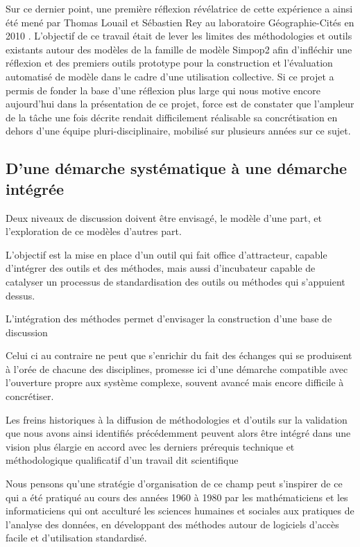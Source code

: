 Sur ce dernier point, une première réflexion révélatrice de cette expérience a ainsi été mené par Thomas Louail et Sébastien Rey au laboratoire Géographie-Cités en 2010 \autocite{Louail2010}. L'objectif de ce travail était de lever les limites des méthodologies et outils existants autour des modèles de la famille de modèle Simpop2 afin d'infléchir une réflexion et des premiers outils prototype pour la construction et l'évaluation automatisé de modèle dans le cadre d'une utilisation collective. Si ce projet a permis de fonder la base d'une réflexion plus large qui nous motive encore aujourd'hui dans la présentation de ce projet, force est de constater que l'ampleur de la tâche une fois décrite rendait difficilement réalisable sa concrétisation en dehors d'une équipe pluri-disciplinaire, mobilisé sur plusieurs années sur ce sujet.


\subsection{D'une démarche systématique à une démarche intégrée}


Deux niveaux de discussion doivent être envisagé, le modèle d'une part, et l'exploration de ce modèles d'autres part.


L'objectif est la mise en place d'un outil qui fait office d'attracteur,  capable d'intégrer des outils et des méthodes, mais aussi d'incubateur capable de catalyser un processus de standardisation des outils ou méthodes qui s'appuient dessus. 

L'intégration des méthodes permet d'envisager la construction d'une base de discussion

Celui ci au contraire ne peut que s'enrichir du fait des échanges qui se produisent à l'orée de chacune des disciplines, promesse ici d'une démarche compatible avec l'ouverture propre aux système complexe, souvent avancé mais encore difficile à concrétiser.
 
Les freins historiques à la diffusion de méthodologies et d'outils sur la validation que nous avons ainsi identifiés précédemment peuvent alors être intégré dans une vision plus élargie en accord avec les derniers prérequis technique et méthodologique qualificatif d'un travail dit scientifique

Nous pensons qu’une stratégie d’organisation de ce champ peut s’inspirer  de ce qui a été pratiqué au cours des années 1960 à 1980 par les mathématiciens et les informaticiens qui ont acculturé les sciences humaines et sociales aux pratiques de l'analyse des données, en développant des méthodes autour de logiciels d'accès facile et d'utilisation standardisé.
